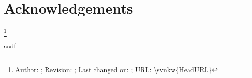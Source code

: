 \section{Acknowledgements}

\footnote{Author: \svnauthor; Revision: \svnrev; Last changed on: \svndate; URL: \url{\svnkw{HeadURL}}}

asdf
